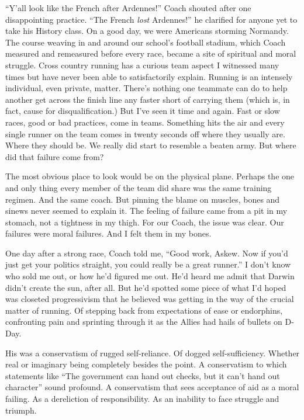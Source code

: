 \documentclass[12pt, oneside]{memoir}
\begin{document}
``Y'all look like the French after Ardennes!'' Coach shouted after one
disappointing practice.
``The French \textit{lost} Ardennes!'' he clarified for anyone yet to
take his History class.
On a good day, we were Americans storming Normandy.
The course weaving in and around our school's football
stadium, which Coach measured and remeasured before every race, became
a site of spiritual and moral struggle.
Cross country running has a curious team aspect I witnessed many times
but have never been able to satisfactorily explain.
Running is an intensely individual, even private, matter.
There's nothing one teammate can do to help another get across the
finish line any faster short of carrying them (which is, in fact,
cause for disqualification.)
But I've seen it time and again.
Fast or slow races, good or bad practices, come in teams.
Something hits the air and every single runner on the team comes in
twenty seconds off where they usually are.
Where they should be.
We really did start to resemble a beaten army.
But where did that failure come from?

The most obvious place to look would be on the physical plane.
Perhaps the one and only thing every member of the team did share was
the same training regimen.
And the same coach.
But pinning the blame on muscles, bones and sinews never seemed to
explain it.
The feeling of failure came from a pit in my stomach, not a tightness
in my thigh.
For our Coach, the issue was clear.
Our failures were moral failures.
And I felt them in my bones.

One day after a strong race, Coach told me, ``Good work,
Askew. Now if you'd just get your politics straight, you could really
be a great runner.''
I don't know who sold me out, or how he'd figured me out.
He'd heard me admit that Darwin didn't create the sun, after all.
But he'd spotted some piece of what I'd hoped was closeted
progressivism that he believed was getting in the way of the crucial
matter of running.
Of stepping back from expectations of ease or endorphins, confronting
pain and sprinting through it as the Allies had hails of bullets on
D-Day.

His was a conservatism of rugged self-reliance.
Of dogged self-sufficiency.
Whether real or imaginary being completely besides the point.
A conservatism to which statements like ``The government can hand out
checks, but it can't hand out character'' sound profound.
A conservatism that sees acceptance of aid as a moral failing.
As a dereliction of responsibility.
As an inability to face struggle and triumph.
\end{document}
